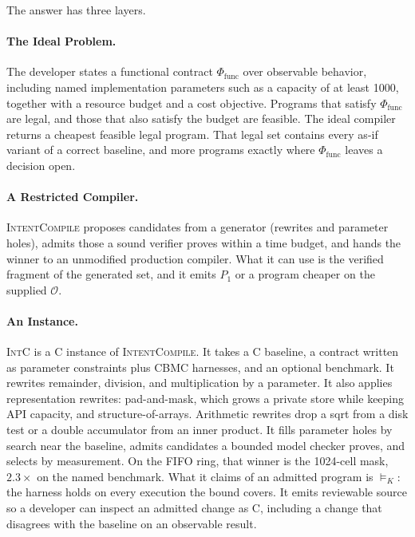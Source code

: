 The answer has three layers.

\paragraph{The Ideal Problem.}
The developer states a functional contract \(\Phi_{\text{func}}\) over
observable behavior, including named implementation parameters such as a
capacity of at least 1000, together with a resource budget and a cost
objective. Programs that satisfy \(\Phi_{\text{func}}\) are legal, and
those that also satisfy the budget are feasible. The ideal compiler
returns a cheapest feasible legal program. That legal set contains every
as-if variant of a correct baseline, and more programs exactly where
\(\Phi_{\text{func}}\) leaves a decision open.

\paragraph{A Restricted Compiler.}
\textsc{IntentCompile} proposes candidates from a generator (rewrites and
parameter holes), admits those a sound verifier proves within a time budget,
and hands the winner to an unmodified production compiler. What it can use
is the verified fragment of the generated set, and it emits \(P_1\) or a
program cheaper on the supplied \(\mathcal{O}\).

\paragraph{An Instance.}
\textsc{IntC} is a C instance of \textsc{IntentCompile}. It takes a C
baseline, a contract written as parameter constraints plus CBMC harnesses,
and an optional benchmark.
It rewrites remainder, division, and multiplication by a parameter. It also
applies representation rewrites: pad-and-mask, which grows a private store
while keeping API capacity, and structure-of-arrays. Arithmetic rewrites drop
a sqrt from a disk test or a double accumulator from an inner product. It fills
parameter holes by search near the baseline, admits candidates a bounded model
checker proves, and selects by measurement. On the FIFO ring, that winner is
the 1024-cell mask, \(2.3\times\) on the named benchmark. What it claims of an admitted
program is \(\models_K\): the harness holds on every execution the bound
covers. It emits reviewable source so a developer can inspect an admitted
change as C, including a change that disagrees with the baseline on an
observable result.

